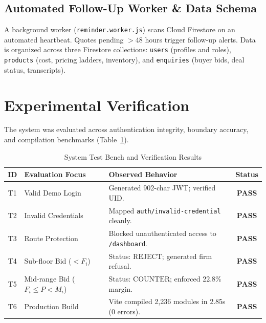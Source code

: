 \documentclass[conference]{IEEEtran}
\begin{document}
\subsection{Automated Follow-Up Worker \& Data Schema}
A background worker (\texttt{reminder.worker.js}) scans Cloud Firestore on an automated heartbeat. Quotes pending $> 48$ hours trigger follow-up alerts. Data is organized across three Firestore collections: \texttt{users} (profiles and roles), \texttt{products} (cost, pricing ladders, inventory), and \texttt{enquiries} (buyer bids, deal status, transcripts).

\section{Experimental Verification}
\label{sec:eval}

The system was evaluated across authentication integrity, boundary accuracy, and compilation benchmarks (Table~\ref{tab:test_suite}).

\begin{table}[htbp]
    \caption{System Test Bench and Verification Results}
    \label{tab:test_suite}
    \centering
    \scriptsize
    \begin{tabular}{cllc}
        \toprule
        \textbf{ID} & \textbf{Evaluation Focus} & \textbf{Observed Behavior} & \textbf{Status} \\
        \midrule
        T1 & Valid Demo Login & Generated 902-char JWT; verified UID. & \textbf{PASS} \\
        T2 & Invalid Credentials & Mapped \texttt{auth/invalid-credential} cleanly. & \textbf{PASS} \\
        T3 & Route Protection & Blocked unauthenticated access to \texttt{/dashboard}. & \textbf{PASS} \\
        T4 & Sub-floor Bid ($<\!F_i$) & Status: $\text{REJECT}$; generated firm refusal. & \textbf{PASS} \\
        T5 & Mid-range Bid ($F_i\!\le\!P\!<\!M_i$) & Status: $\text{COUNTER}$; enforced 22.8\% margin. & \textbf{PASS} \\
        T6 & Production Build & Vite compiled 2,236 modules in 2.85s (0 errors). & \textbf{PASS} \\
        \bottomrule
    \end{tabular}
\end{table}
\end{document}
